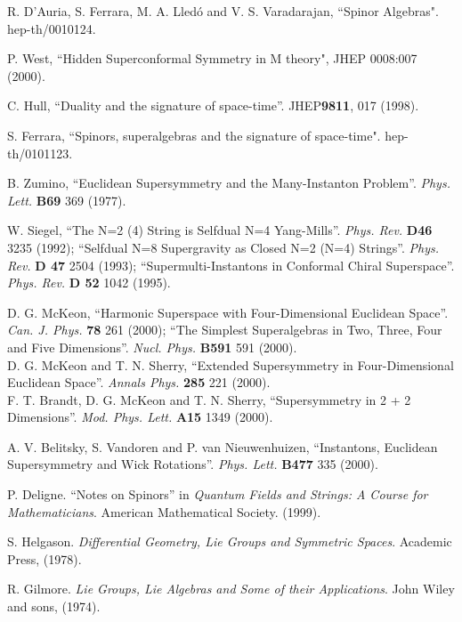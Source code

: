\documentclass[a4paper,12pt]{article}
\begin{document}
\begin{thebibliography}{99}
 R. D'Auria, S. Ferrara,  M. A. Lled\'o and V. S. Varadarajan,
``Spinor Algebras". hep-th/0010124.

 P. West, ``Hidden Superconformal Symmetry in M theory", JHEP 0008:007 (2000).

 C. Hull, ``Duality and the signature of space-time''.
JHEP{\bf 9811}, 017 (1998).

 S. Ferrara, ``Spinors, superalgebras and the signature of
space-time". hep-th/0101123.

B. Zumino, ``Euclidean Supersymmetry and the Many-Instanton
Problem''. {\it  Phys. Lett.} {\bf B69} 369 (1977).

 W. Siegel,
``The N=2 (4) String is Selfdual N=4 Yang-Mills''. {\it Phys.
Rev.} {\bf D46} 3235 (1992); ``Selfdual N=8 Supergravity as Closed
N=2 (N=4) Strings''. {\it Phys.  Rev. } {\bf D 47} 2504 (1993);
``Supermulti-Instantons in Conformal Chiral Superspace''. {\it
Phys.  Rev.} {\bf D 52} 1042 (1995).


D. G. McKeon, ``Harmonic Superspace with Four-Dimensional
Euclidean Space''. {\it  Can.  J.  Phys.} {\bf 78} 261 (2000);
``The Simplest Superalgebras in Two, Three, Four and Five
Dimensions''. {\it  Nucl.  Phys.} {\bf B591} 591 (2000).\\ D. G.
McKeon and T. N. Sherry, ``Extended Supersymmetry in
Four-Dimensional Euclidean Space''.  {\it Annals Phys.}  {\bf 285}
221 (2000). \\F. T. Brandt, D. G. McKeon and T. N. Sherry,
``Supersymmetry in 2 + 2 Dimensions''. {\it  Mod.  Phys.  Lett.}
{\bf A15} 1349 (2000).

 A. V. Belitsky, S. Vandoren and P. van Nieuwenhuizen,
``Instantons, Euclidean Supersymmetry and Wick Rotations''. {\it
Phys.  Lett. } {\bf B477} 335 (2000).


 P. Deligne. ``Notes on Spinors'' in {\it Quantum Fields
and Strings: A Course for Mathematicians}. American Mathematical
Society. (1999).

 S. Helgason. {\it Differential Geometry, Lie Groups and Symmetric Spaces}.
Academic Press, (1978).

 R. Gilmore. {\it Lie Groups, Lie Algebras and Some of their Applications}.
John Wiley and sons, (1974).









\end{thebibliography}
\end{document}
